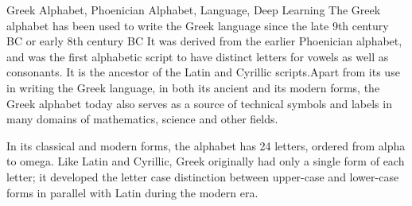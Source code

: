 \documentclass[master]{seuthesis} %
\begin{document}
\begin{abstract}{无线信道密钥生成，物理层安全，信道互易性}
\begin{itemize}
    \item FDD模式下，本文使用搭建的无线密钥生成系统在相同的9种情况下连续长时间测量无线信道并生成密钥，并分析多项指标。实验结果表明，FDD模式下，合法通信双方CSI之间互易性并不完全好于和窃听者的互易性，其平均信息安全率也较差于FDD模式。FDD模式下不同情况下的CSI图像熵与TDD模式相似，但是其生成密钥在NIST随机性测试中的表现稍逊与FDD模式。在密钥生成速率方面，由于FDD模式下密钥一致率的降低，相同的降采样率下，TDD模式的密钥生成速率约为FDD模式的3倍。同时，由于相同的原因，FDD模式下的纠错码调和方案表现较差，在密钥一致率较低时，恢复的消息具有较大的误比特率。
\end{itemize}
\quad %
\end{abstract}

\begin{englishabstract}{Greek Alphabet, Phoenician Alphabet, Language, Deep Learning}
The Greek alphabet has been used to write the Greek language since the late 9th century BC or early 8th century BC It was derived from the earlier Phoenician alphabet, and was the first alphabetic script to have distinct letters for vowels as well as consonants. It is the ancestor of the Latin and Cyrillic scripts.Apart from its use in writing the Greek language, in both its ancient and its modern forms, the Greek alphabet today also serves as a source of technical symbols and labels in many domains of mathematics, science and other fields.

In its classical and modern forms, the alphabet has 24 letters, ordered from alpha to omega. Like Latin and Cyrillic, Greek originally had only a single form of each letter; it developed the letter case distinction between upper-case and lower-case forms in parallel with Latin during the modern era.
\end{englishabstract}

\tableofcontents


\end{document}
